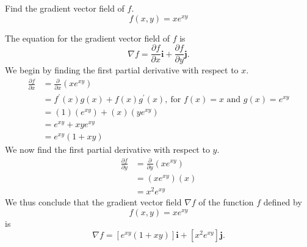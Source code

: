 \begin{exercise}
	Find the gradient vector field of $f$.
	\begin{equation*}
	f\left(x,y\right)=xe^{xy}
	\end{equation*}
\end{exercise}
\begin{solution}
	The equation for the gradient vector field of $f$ is
	\begin{equation*}
	\nabla f = \frac{\partial f}{\partial x}\mathbf{i} + \frac{\partial f}{\partial y}\mathbf{j}.
	\end{equation*}
	We begin by finding the first partial derivative with respect to $x$.
	\begin{align*}
	\frac{\partial f}{\partial x} &= \frac{\partial}{\partial x}\left( xe^{xy} \right) \\
	&= f^{\prime}\left(x\right)g\left(x\right) + f\left(x\right)g^{\prime}\left(x\right), \ \text{for $f(x)=x$ and $g(x)=e^{xy}$}\\
	&= \left(1\right)\left(e^{xy}\right) + \left(x\right)\left(ye^{xy}\right) \\
	&= e^{xy} + xye^{xy} \\
	&= e^{xy}\left(1 + xy\right)
	\end{align*}
	We now find the first partial derivative with respect to $y$.
	\begin{align*}
	\frac{\partial f}{\partial y} &= \frac{\partial}{\partial y}\left(xe^{xy}\right) \\
	&= \left(xe^{xy}\right)\left(x\right) \\
	&= x^2e^{xy}
	\end{align*}
	We thus conclude that the gradient vector field $\nabla f$ of the function $f$ defined by
	\begin{equation*}
	f\left(x,y\right)=xe^{xy}
	\end{equation*}
	is
	\begin{equation*}
	\nabla f = \left[ e^{xy}\left(1+xy\right) \right]\mathbf{i} + \left[ x^2e^{xy} \right]\mathbf{j}.
	\end{equation*}
\end{solution}
